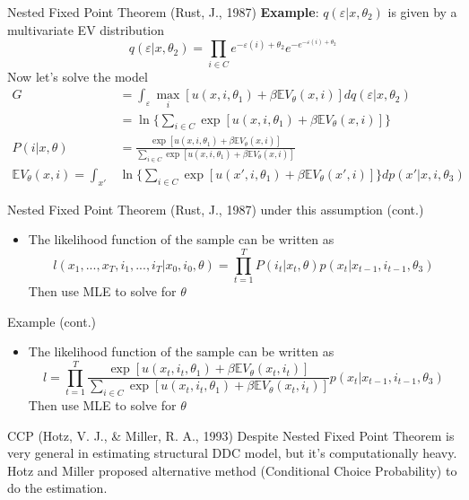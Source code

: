 \documentclass[10pt]{beamer}
\begin{document}
\begin{frame}{Nested Fixed Point Theorem (Rust, J., 1987)}
\textbf{Example}: $q(\varepsilon|x,\theta_2)$ is given by a multivariate EV distribution
$$q(\varepsilon|x,\theta_2)=\prod_{i\in C}e^{-\varepsilon(i)+\theta_2}e^{-e^{-\varepsilon(i)+\theta_2}}$$
Now let's solve the model
\begin{align*}
	G &= \int_\varepsilon \max_i [u(x,i,\theta_1)+\beta\mathbb{E}V_\theta(x,i)]dq(\varepsilon|x,\theta_2)\\
	& = \ln \bigg\{\sum_{i\in C} \exp[u(x,i,\theta_1)+\beta\mathbb{E}V_\theta(x,i)]\bigg\}\\
	P(i|x,\theta) &=\frac{\exp[u(x,i,\theta_1)+\beta\mathbb{E}V_\theta(x,i)]}{\sum_{i\in C}\exp[u(x,i,\theta_1)+\beta\mathbb{E}V_\theta(x,i)]}\\
	\mathbb{E}V_\theta(x,i)=\int_{x'}&\ln \bigg\{\sum_{i\in C} \exp[u(x',i,\theta_1)+\beta\mathbb{E}V_\theta(x',i)]\bigg\} dp(x'|x,i,\theta_3)
\end{align*}

\end{frame}


\begin{frame}{Nested Fixed Point Theorem (Rust, J., 1987)}
under this assumption (cont.)
\begin{itemize}
	\item The likelihood function of the sample can be written as 
	$$l(x_1,...,x_T, i_1,...,i_T|x_0,i_0,\theta)=\prod_{t=1}^TP(i_t|x_t,\theta)p(x_t|x_{t-1},i_{t-1},\theta_3)$$
	Then use MLE to solve for $\theta$
\end{itemize}
Example (cont.)
\begin{itemize}
	\item The likelihood function of the sample can be written as 
	$$l=\prod_{t=1}^T\frac{\exp[u(x_t,i_t,\theta_1)+\beta\mathbb{E}V_\theta(x_t,i_t)]}{\sum_{i\in C}\exp[u(x_t,i_t,\theta_1)+\beta\mathbb{E}V_\theta(x_t,i_t)]}p(x_t|x_{t-1},i_{t-1},\theta_3)$$
	Then use MLE to solve for $\theta$
\end{itemize}
\end{frame}

\begin{frame}{CCP (Hotz, V. J., \& Miller, R. A., 1993)}
Despite Nested Fixed Point Theorem is very general in estimating structural DDC model, but it's computationally heavy. Hotz and Miller proposed alternative method (Conditional Choice Probability) to do the estimation.

\end{frame}
\end{document}
